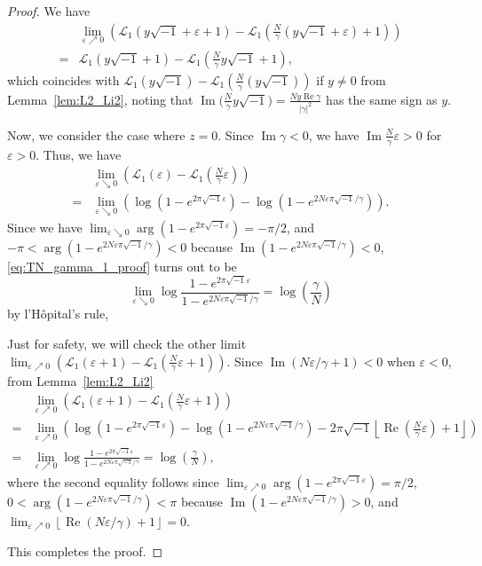 \documentclass[a4paper,dvipdfmx]{amsart}
\theoremstyle{plain}
\theoremstyle{definition}
\theoremstyle{remark}
\renewcommand{\L}{\mathcal{L}}
\renewcommand{\Re}{\operatorname{Re}}
\renewcommand{\Im}{\operatorname{Im}}
\renewcommand{\i}{\sqrt{-1}}
\numberwithin{equation}{section}
\begin{document}
\begin{proof}
We have
\begin{align*}
  &\lim_{\varepsilon\nearrow0}
  \left(
    \L_1(y\i+\varepsilon+1)-\L_1\left(\frac{N}{\gamma}(y\i+\varepsilon)+1\right)
  \right)
  \\
  =&
  \L_1(y\i+1)-\L_1\left(\frac{N}{\gamma}y\i+1\right),
\end{align*}
which coincides with $\L_1(y\i)-\L_1\left(\frac{N}{\gamma}(y\i)\right)$ if $y\ne0$ from Lemma~\ref{lem:L2_Li2}, noting that $\Im\bigl(\frac{N}{\gamma}y\i\bigr)=\frac{Ny\Re\gamma}{|\gamma|^2}$ has the same sign as $y$.
\par
Now, we consider the case where $z=0$.
Since $\Im\gamma<0$, we have $\Im\frac{N}{\gamma}\varepsilon>0$ for $\varepsilon>0$.
Thus, we have
\begin{equation}\label{eq:TN_gamma_1_proof}
\begin{split}
  &\lim_{\varepsilon\searrow0}
  \left(
    \L_1(\varepsilon)-\L_1\left(\frac{N}{\gamma}\varepsilon\right)
  \right)
  \\
  =&
  \lim_{\varepsilon\searrow0}
  \left(
    \log\left(1-e^{2\pi\i\varepsilon}\right)
    -
    \log\left(1-e^{2N\varepsilon\pi\i/\gamma}\right)
  \right).
\end{split}
\end{equation}
Since we have $\lim_{\varepsilon\searrow0}\arg\left(1-e^{2\pi\i\varepsilon}\right)=-\pi/2$, and $-\pi<\arg\left(1-e^{2N\varepsilon\pi\i/\gamma}\right)<0$ because $\Im\left(1-e^{2N\varepsilon\pi\i/\gamma}\right)<0$, \eqref{eq:TN_gamma_1_proof} turns out to be
\begin{equation*}
  \lim_{\varepsilon\searrow0}
  \log\frac{1-e^{2\pi\i\varepsilon}}{1-e^{2N\varepsilon\pi\i/\gamma}}
  =
  \log\left(\frac{\gamma}{N}\right)
\end{equation*}
by l'H{\^o}pital's rule,
\par
Just for safety, we will check the other limit $\lim_{\varepsilon\nearrow0}\left(\L_1(\varepsilon+1)-\L_1\left(\frac{N}{\gamma}\varepsilon+1\right)\right)$.
Since $\Im(N\varepsilon/\gamma+1)<0$ when $\varepsilon<0$, from Lemma~\ref{lem:L2_Li2}
\begin{align*}
  &\lim_{\varepsilon\nearrow0}
  \left(
    \L_1(\varepsilon+1)-\L_1\left(\frac{N}{\gamma}\varepsilon+1\right)
  \right)
  \\
  =&
  \lim_{\varepsilon\nearrow0}
  \left(
    \log\left(1-e^{2\pi\i\varepsilon}\right)
    -
    \log\left(1-e^{2N\varepsilon\pi\i/\gamma}\right)
    -
    2\pi\i\left\lfloor\Re\left(\frac{N}{\gamma}\varepsilon\right)+1\right\rfloor
  \right)
  \\
  =&
  \lim_{\varepsilon\nearrow0}
  \log\frac{1-e^{2\pi\i\varepsilon}}{1-e^{2N\varepsilon\pi\i/\gamma}}
  =
  \log\left(\frac{\gamma}{N}\right),
\end{align*}
where the second equality follows since $\lim_{\varepsilon\nearrow0}\arg\left(1-e^{2\pi\i\varepsilon}\right)=\pi/2$, $0<\arg\left(1-e^{2N\varepsilon\pi\i/\gamma}\right)<\pi$ because $\Im\left(1-e^{2N\varepsilon\pi\i/\gamma}\right)>0$, and $\lim_{\varepsilon\nearrow0}\left\lfloor\Re(N\varepsilon/\gamma)+1\right\rfloor=0$.
\par
This completes the proof.
\end{proof}
\end{document}
